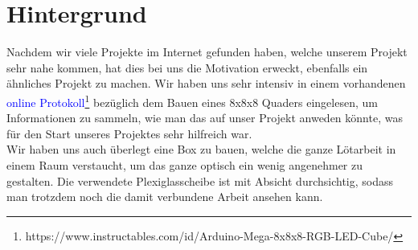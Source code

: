 \documentclass[12pt,a4paper]{article}
\begin{document}
%
    

\section{Hintergrund}

Nachdem wir viele Projekte im Internet gefunden haben, welche unserem Projekt sehr nahe kommen, 
hat dies bei uns die Motivation erweckt, ebenfalls ein ähnliches Projekt zu machen.
Wir haben uns sehr intensiv in einem vorhandenen \textcolor{blue}{online Protokoll}\footnote{https://www.instructables.com/id/Arduino-Mega-8x8x8-RGB-LED-Cube/} bezüglich dem Bauen eines 
8x8x8 Quaders eingelesen, um Informationen zu sammeln, wie man das auf unser Projekt anweden könnte,
was für den Start unseres Projektes sehr hilfreich war. \\
Wir haben uns auch überlegt eine Box zu bauen, welche die ganze Lötarbeit in einem Raum verstaucht, um das ganze optisch ein wenig
angenehmer zu gestalten. Die verwendete Plexiglasscheibe ist mit Absicht durchsichtig, sodass man trotzdem noch
die damit verbundene Arbeit ansehen kann.
\end{document}
